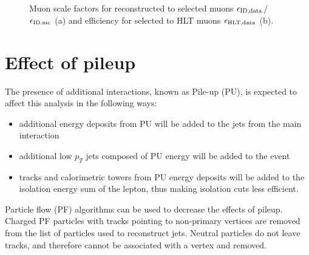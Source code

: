\begin{figure}[t]
  \begin{center}
    \caption{Muon scale factors for reconstructed to selected muons $\epsilon_{\textnormal{ID,data}}$/$\epsilon_{\textnormal{ID,mc}}$ (a) and 
    efficiency for selected to HLT muons $\epsilon_{\textnormal{HLT,data}}$ (b).}
    \label{fig:muonEff}
  \end{center}
\end{figure}

\section{Effect of pileup}
\label{sec:pileup}
The presence of additional interactions, known as Pile-up (PU), is expected to affect
this analysis in the following ways:
\begin{itemize}
\item additional energy deposits from PU will be added to the jets from the main 
interaction
\item additional low $p_{T}$ jets composed of PU energy will be
added to the event
\item tracks and calorimetric towers from PU energy deposits will be
added to the isolation energy sum of the lepton, thus making isolation 
cuts less efficient.
\end{itemize}
Particle flow (PF) algorithms can be used to decrease the effects of pileup. 
Charged PF particles with tracks pointing to non-primary 
vertices are removed from the list of particles used to reconstruct jets. 
Neutral particles do not leave tracks, and therefore cannot be associated with
a vertex and removed. 

